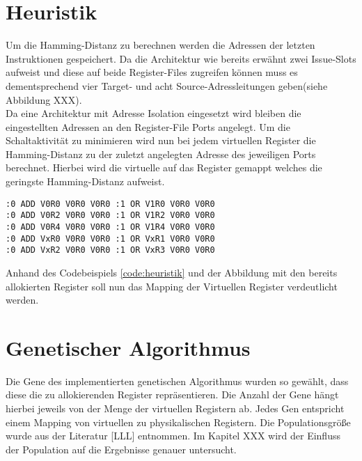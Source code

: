 \section{Heuristik}
\label{sec:Heuristik}
Um die Hamming-Distanz zu berechnen werden die Adressen der letzten Instruktionen gespeichert. Da die Architektur  wie bereits erwähnt zwei Issue-Slots aufweist und diese auf beide Register-Files zugreifen können muss es dementsprechend vier Target- und acht Source-Adressleitungen geben(siehe Abbildung XXX).\\
Da eine Architektur mit Adresse Isolation eingesetzt wird bleiben die eingestellten Adressen an den Register-File Ports angelegt. Um die Schaltaktivität zu minimieren wird nun bei jedem virtuellen Register die Hamming-Distanz zu der zuletzt angelegten Adresse des jeweiligen Ports berechnet. Hierbei wird die virtuelle auf das Register gemappt welches die geringste Hamming-Distanz aufweist.\\
\begin{lstlisting}[frame=single, caption={Heuristik Beispiel},captionpos=b,label=code:heuristik]
:0 ADD V0R0 V0R0 V0R0 :1 OR V1R0 V0R0 V0R0
:0 ADD V0R2 V0R0 V0R0 :1 OR V1R2 V0R0 V0R0
:0 ADD V0R4 V0R0 V0R0 :1 OR V1R4 V0R0 V0R0
:0 ADD VxR0 V0R0 V0R0 :1 OR VxR1 V0R0 V0R0
:0 ADD VxR2 V0R0 V0R0 :1 OR VxR3 V0R0 V0R0
\end{lstlisting}
Anhand des Codebeispiels \ref{code:heuristik} und der Abbildung mit den bereits allokierten Register soll nun das Mapping der Virtuellen Register verdeutlicht werden.  


\section{Genetischer Algorithmus}
\label{sec:genetischerAlgorithmus}
Die Gene des implementierten genetischen Algorithmus wurden so gewählt, dass diese die zu allokierenden Register repräsentieren. Die Anzahl der Gene hängt hierbei jeweils von der Menge der virtuellen Registern ab. Jedes Gen entspricht einem Mapping von virtuellen zu physikalischen Registern.
Die Populationsgröße wurde aus der Literatur [LLL] entnommen. Im Kapitel XXX wird der Einfluss der Population auf die Ergebnisse genauer untersucht. 


